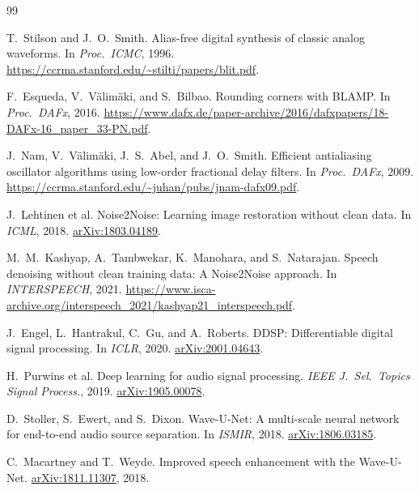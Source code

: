 \documentclass[10pt,twocolumn,letterpaper]{article}
\theoremstyle{remark}
\begin{document}
\FloatBarrier
\raggedbottom
\balance
{\footnotesize
\setlength{\baselineskip}{11.5pt}
\begin{thebibliography}{99}
\setlength{\itemsep}{0.25ex plus 0.05ex}
\setlength{\parsep}{0pt}
\setlength{\parskip}{0pt}

T.~Stilson and J.~O.~Smith.
\newblock Alias-free digital synthesis of classic analog waveforms.
\newblock In \emph{Proc.\ ICMC}, 1996.
\newblock \url{https://ccrma.stanford.edu/~stilti/papers/blit.pdf}.

F.~Esqueda, V.~V\"alim\"aki, and S.~Bilbao.
\newblock Rounding corners with BLAMP.
\newblock In \emph{Proc.\ DAFx}, 2016.
\newblock \url{https://www.dafx.de/paper-archive/2016/dafxpapers/18-DAFx-16_paper_33-PN.pdf}.

J.~Nam, V.~V\"alim\"aki, J.~S.~Abel, and J.~O.~Smith.
\newblock Efficient antialiasing oscillator algorithms using low-order fractional delay filters.
\newblock In \emph{Proc.\ DAFx}, 2009.
\newblock \url{https://ccrma.stanford.edu/~juhan/pubs/jnam-dafx09.pdf}.

J.~Lehtinen et al.
\newblock Noise2Noise: Learning image restoration without clean data.
\newblock In \emph{ICML}, 2018.
\newblock \href{https://arxiv.org/abs/1803.04189}{arXiv:1803.04189}.

M.~M.~Kashyap, A.~Tambwekar, K.~Manohara, and S.~Natarajan.
\newblock Speech denoising without clean training data: A Noise2Noise approach.
\newblock In \emph{INTERSPEECH}, 2021.
\newblock \url{https://www.isca-archive.org/interspeech_2021/kashyap21_interspeech.pdf}.

J.~Engel, L.~Hantrakul, C.~Gu, and A.~Roberts.
\newblock DDSP: Differentiable digital signal processing.
\newblock In \emph{ICLR}, 2020.
\newblock \href{https://arxiv.org/abs/2001.04643}{arXiv:2001.04643}.

H.~Purwins et al.
\newblock Deep learning for audio signal processing.
\newblock \emph{IEEE J.\ Sel.\ Topics Signal Process.}, 2019.
\newblock \href{https://arxiv.org/abs/1905.00078}{arXiv:1905.00078}.

D.~Stoller, S.~Ewert, and S.~Dixon.
\newblock Wave-U-Net: A multi-scale neural network for end-to-end audio source separation.
\newblock In \emph{ISMIR}, 2018.
\newblock \href{https://arxiv.org/abs/1806.03185}{arXiv:1806.03185}.

C.~Macartney and T.~Weyde.
\newblock Improved speech enhancement with the Wave-U-Net.
\newblock \href{https://arxiv.org/abs/1811.11307}{arXiv:1811.11307}, 2018.


\end{thebibliography}}
\end{document}
